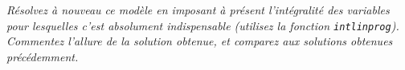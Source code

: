 \question %
\emph{Résolvez à nouveau ce modèle en imposant à présent l'intégralité des
variables pour lesquelles c'est absolument indispensable
(utilisez la fonction \texttt{intlinprog}).
Commentez l'allure de la solution obtenue,
et comparez aux solutions obtenues précédemment.}
